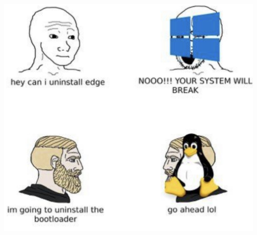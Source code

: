\documentclass[graphics]{beamer}
\begin{document}
\begin{frame}
    \centering
    \includegraphics[scale=0.24]{Images/windows_v_linux_uninstalling.jpg}
\end{frame}
\end{document}
